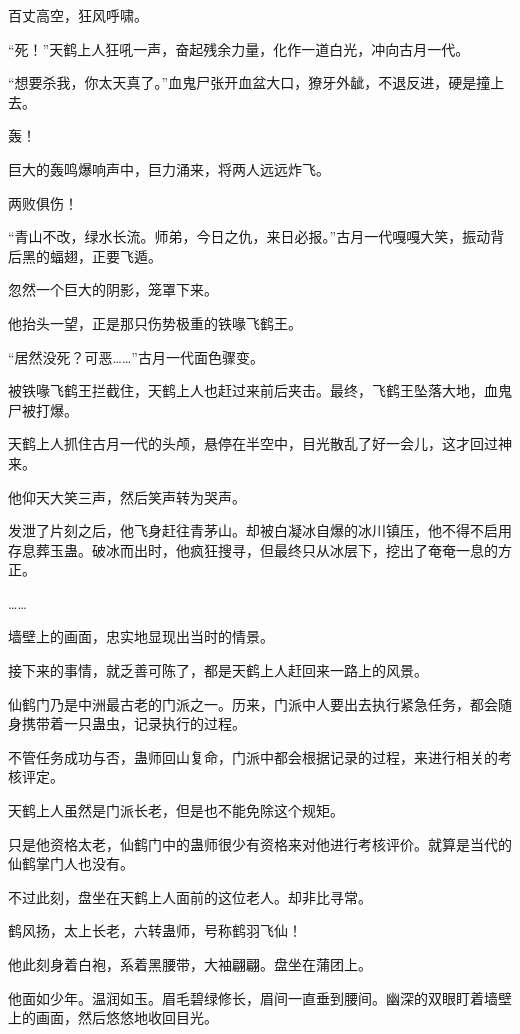 
\begin{this_body}

百丈高空，狂风呼啸。

“死！”天鹤上人狂吼一声，奋起残余力量，化作一道白光，冲向古月一代。

“想要杀我，你太天真了。”血鬼尸张开血盆大口，獠牙外龇，不退反进，硬是撞上去。

轰！

巨大的轰鸣爆响声中，巨力涌来，将两人远远炸飞。

两败俱伤！

“青山不改，绿水长流。师弟，今日之仇，来日必报。”古月一代嘎嘎大笑，振动背后黑的蝠翅，正要飞遁。

忽然一个巨大的阴影，笼罩下来。

他抬头一望，正是那只伤势极重的铁喙飞鹤王。

“居然没死？可恶……”古月一代面色骤变。

被铁喙飞鹤王拦截住，天鹤上人也赶过来前后夹击。最终，飞鹤王坠落大地，血鬼尸被打爆。

天鹤上人抓住古月一代的头颅，悬停在半空中，目光散乱了好一会儿，这才回过神来。

他仰天大笑三声，然后笑声转为哭声。

发泄了片刻之后，他飞身赶往青茅山。却被白凝冰自爆的冰川镇压，他不得不启用存息葬玉蛊。破冰而出时，他疯狂搜寻，但最终只从冰层下，挖出了奄奄一息的方正。

……

墙壁上的画面，忠实地显现出当时的情景。

接下来的事情，就乏善可陈了，都是天鹤上人赶回来一路上的风景。

仙鹤门乃是中洲最古老的门派之一。历来，门派中人要出去执行紧急任务，都会随身携带着一只蛊虫，记录执行的过程。

不管任务成功与否，蛊师回山复命，门派中都会根据记录的过程，来进行相关的考核评定。

天鹤上人虽然是门派长老，但是也不能免除这个规矩。

只是他资格太老，仙鹤门中的蛊师很少有资格来对他进行考核评价。就算是当代的仙鹤掌门人也没有。

不过此刻，盘坐在天鹤上人面前的这位老人。却非比寻常。

鹤风扬，太上长老，六转蛊师，号称鹤羽飞仙！

他此刻身着白袍，系着黑腰带，大袖翩翩。盘坐在蒲团上。

他面如少年。温润如玉。眉毛碧绿修长，眉间一直垂到腰间。幽深的双眼盯着墙壁上的画面，然后悠悠地收回目光。


\end{this_body}
